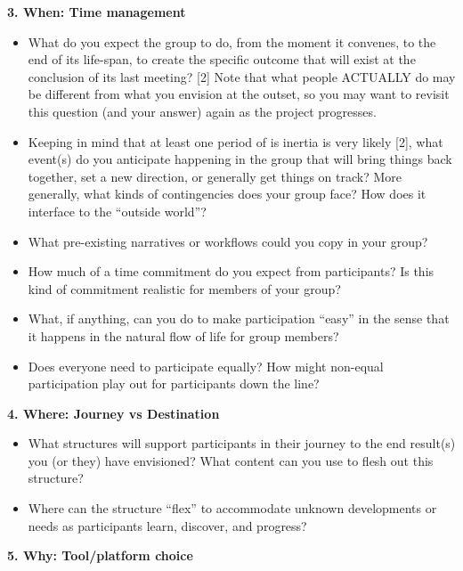 \textbf{3. When: Time management}

\begin{itemize}
\itemsep1pt\parskip0pt
\item
  What do you expect the group to do, from the moment it convenes, to
  the end of its life-span, to create the specific outcome that will
  exist at the conclusion of its last meeting? [2]  Note that
  what people ACTUALLY do may be different from what you envision at the
  outset, so you may want to revisit this question (and your answer)
  again as the project progresses.
\item
  Keeping in mind that at least one period of is inertia is very likely
  [2], what event(s) do you anticipate happening in the group
  that will bring things back together, set a new direction, or
  generally get things on track? More generally, what kinds of
  contingencies does your group face? How does it interface to the
  ``outside world''?
\item
  What pre-existing narratives or workflows could you copy in your
  group?
\item
  How much of a time commitment do you expect from participants? Is this
  kind of commitment realistic for members of your group?
\item
  What, if anything, can you do to make participation ``easy'' in the
  sense that it happens in the natural flow of life for group members?
\item
  Does everyone need to participate equally? How might non-equal
  participation play out for participants down the line?
\end{itemize}

\textbf{4. Where: Journey vs Destination}

\begin{itemize}
\itemsep1pt\parskip0pt
\item
  What structures will support participants in their journey to the end
  result(s) you (or they) have envisioned? What content can you use to
  flesh out this structure?
\item
  Where can the structure ``flex'' to accommodate unknown developments
  or needs as participants learn, discover, and progress?
\end{itemize}

\textbf{5. Why: Tool/platform choice}

